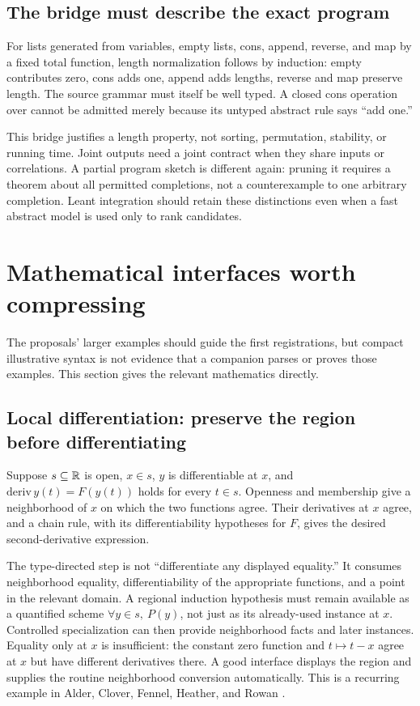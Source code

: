 \documentclass[11pt,letterpaper]{article}
\newcommand{\code}[1]{\texttt{\detokenize{#1}}}
\theoremstyle{definition}\newtheorem{definition}[proposition]{Definition}
\theoremstyle{remark}\newtheorem{remark}[proposition]{Remark}
\begin{document}
\subsection{The bridge must describe the exact program}

For lists generated from variables, empty lists, cons, append, reverse, and
map by a fixed total function, length normalization follows by induction:
empty contributes zero, cons adds one, append adds lengths, reverse and map
preserve length. The source grammar must itself be well typed. A closed cons
operation over \code{Empty} cannot be admitted merely because its untyped
abstract rule says ``add one.''

This bridge justifies a length property, not sorting, permutation, stability,
or running time. Joint outputs need a joint contract when they share inputs
or correlations. A partial program sketch is different again: pruning it
requires a theorem about all permitted completions, not a counterexample to
one arbitrary completion. Leant integration should retain these distinctions
even when a fast abstract model is used only to rank candidates.

\section{Mathematical interfaces worth compressing}
\label{sec:math}

The proposals' larger examples should guide the first registrations, but
compact illustrative syntax is not evidence that a companion parses or
proves those examples. This section gives the relevant mathematics directly.

\subsection{Local differentiation: preserve the region before differentiating}

Suppose $s\subseteq\mathbb R$ is open, $x\in s$, $y$ is differentiable at $x$, and
$\mathrm{deriv}\,y(t)=F(y(t))$ holds for every $t\in s$. Openness and membership
give a neighborhood of $x$ on which the two functions agree. Their derivatives
at $x$ agree, and a chain rule, with its differentiability hypotheses for $F$,
gives the desired second-derivative expression.

The type-directed step is not ``differentiate any displayed equality.'' It
consumes neighborhood equality, differentiability of the appropriate functions,
and a point in the relevant domain. A regional induction hypothesis must remain
available as a quantified scheme $\forall y\in s,\ P(y)$, not just as its
already-used instance at $x$. Controlled specialization can then provide
neighborhood facts and later instances. Equality only at $x$ is insufficient:
the constant zero function and $t\mapsto t-x$ agree at $x$ but have different
derivatives there. A good interface displays the region and supplies the
routine neighborhood conversion automatically. This is a recurring example
in Alder, Clover, Fennel, Heather, and Rowan \cite{alder,clover,fennel,heather,rowan}.
\end{document}
